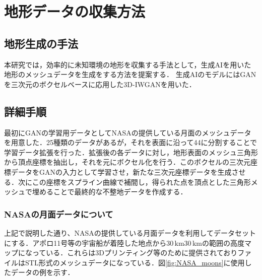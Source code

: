 \documentclass[uplatex,twocolumn, dvipdfmx]{jsarticle}  %
\begin{document}
\section{地形データの収集方法}
\subsection{地形生成の手法}
本研究では，効率的に未知環境の地形を収集する手法として，生成AIを用いた地形のメッシュデータを生成をする方法を提案する．
生成AIのモデルにはGANを三次元のボクセルベースに応用した3D-IWGANを用いた．\cite{bunken3}

\subsection{詳細手順}
最初にGANの学習用データとしてNASAの提供している月面のメッシュデータを用意した．25種類のデータがあるが，それを表面に沿って4\times4に分割することで学習データ拡張を行った．拡張後の各データに対し，地形表面のメッシュ三角形から頂点座標を抽出し，それを元にボクセル化を行う．このボクセルの三次元座標データをGANの入力として学習させ，新たな三次元座標データを生成させる．次にこの座標をスプライン曲線で補間し，得られた点を頂点とした三角形メッシュで埋めることで最終的な不整地データを作成する．

\subsubsection{NASAの月面データについて}
上記で説明した通り、NASAの提供している月面データを利用してデータセットにする．アポロ11号等の宇宙船が着陸した地点から$30 \mathrm{\, km}$\times$30\mathrm{\, km}$の範囲の高度マップになっている．これらは3Dプリンティング等のために提供されておりファイルはSTL形式のメッシュデータになっている．図\ref{fig:NASA_moons}に使用したデータの例を示す．
\end{document}
